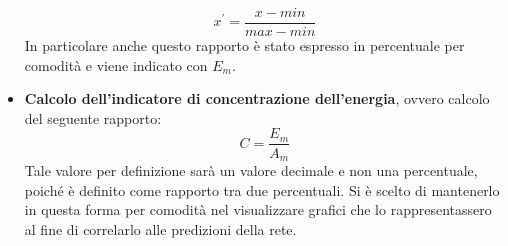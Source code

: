 \begin{itemize}
\begin{equation} 
\label{normalizzazione_minmax}
x^{'}=\frac{x-min}{max-min}
\end{equation}
In particolare anche questo rapporto è stato espresso in percentuale per comodità e viene indicato con $E_{m}$.
\item \textbf{Calcolo dell'indicatore di concentrazione dell'energia}, ovvero calcolo del seguente rapporto:
\begin{equation} 
\label{indicatore}
C=\frac{E_{m}}{A_{m}}
\end{equation}
Tale valore per definizione sarà un valore decimale e non una percentuale, poiché è definito come rapporto tra due percentuali. Si è scelto di mantenerlo in questa forma per comodità nel visualizzare grafici che lo rappresentassero al fine di correlarlo alle predizioni della rete. 
\end{itemize}